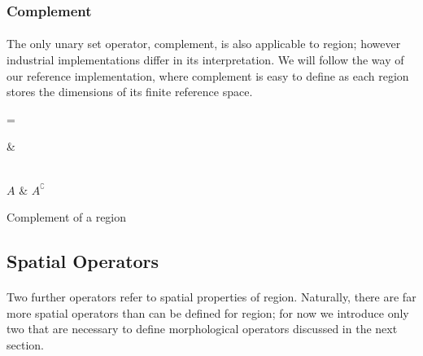 \subsubsection{Complement}

\paragraph*{}
The only unary set operator, complement, is also applicable to region; however industrial implementations differ in its interpretation. We will follow the way of our reference implementation, where complement is easy to define as each region stores the dimensions of its finite reference space.

\newarray\complementInput
{}

\newarray\complementResult
{}

\dataheight=\gridwidth

\begin{table}[h!]
\centering
{}

 &

\\

$A$ &
$A^{\complement}$

\endtabular
\caption{Complement of a region}
\label{tab:RegionComplement}
\end{table}


\subsection{Spatial Operators}

\paragraph*{} 
Two further operators refer to spatial properties of region. Naturally, there are far more spatial operators than can be defined for region; for now we introduce only two that are necessary to define morphological operators discussed in the next section.

